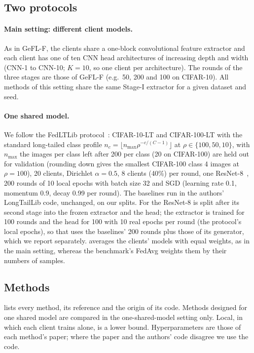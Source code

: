 \subsection{Two protocols}\label{sec:setup-protocols}

\paragraph{Main setting: different client models.} As in GeFL-F, the clients share a one-block convolutional feature
extractor and each client has one of ten CNN head architectures of increasing depth and width (CNN-1 to CNN-10;
$K=10$, so one client per architecture). The rounds of the three stages are those of GeFL-F (e.g.\ 50, 200 and 100 on
CIFAR-10). All methods of this setting share the same Stage-I extractor for a given dataset and seed.

\paragraph{One shared model.} We follow the FedLTLib protocol~\cite{lin2026fedltlib}: CIFAR-10-LT and CIFAR-100-LT with
the standard long-tailed class profile $n_c=\lfloor n_{\max}\rho^{-c/(C-1)}\rfloor$ at $\rho\in\{100,50,10\}$, with
$n_{\max}$ the images per class left after 200 per class (20 on CIFAR-100) are held out for validation (rounding down
gives the smallest CIFAR-100 class 4 images at $\rho=100$), 20 clients, Dirichlet $\alpha=0.5$,
8 clients (40\%) per round, one ResNet-8~\cite{he2016resnet}, 200 rounds of 10 local epochs with batch size 32 and SGD
(learning rate 0.1, momentum 0.9, decay 0.99 per round). The baselines run in the authors' LongTailLib code, unchanged,
on our splits. For \ours the ResNet-8 is split after its second stage into the frozen extractor and the head; the
extractor is trained for 100 rounds and the head for 100 with 10 real epochs per round (the protocol's local epochs),
so that \ours uses the baselines' 200 rounds plus those of its generator, which we report separately. \ours averages
the clients' models with equal weights, as in the main setting, whereas the benchmark's FedAvg weights them by their
numbers of samples.

\subsection{Methods}\label{sec:setup-methods}

 lists every method, its reference and the origin of its code. Methods designed for one shared
model are compared in the one-shared-model setting only. Local, in which each client trains alone, is a lower bound.
Hyperparameters are those of each method's paper; where the paper and the authors' code disagree we use the code.

